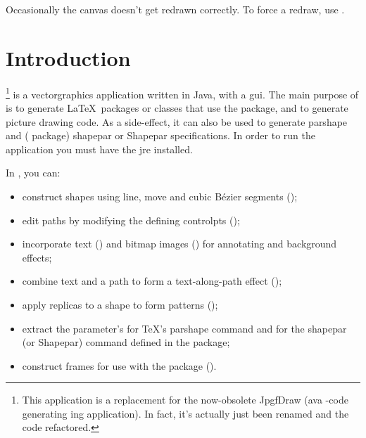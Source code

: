 Occasionally the canvas doesn't get redrawn correctly. To force a
redraw, use .


\mainmatter
\chapter{Introduction}
\label{sec:introduction}

\appname\footnote{This application is a replacement for the now-obsolete
   JpgfDraw (ava -code generating ing application).
   In fact, it's actually just been renamed and the code refactored.}
   is a \gls{vectorgraphics} application written in \gls{Java}, with a 
   \gls{gui}.  The main purpose of \appname is to generate \LaTeX\ packages or 
   classes that use the  package, and to generate
    picture drawing code. As a side-effect, it can also be
   used to generate \gls{parshape} and ( package) \gls{shapepar} or 
   \gls{Shapepar} specifications. In order to run the application you 
   must have the \gls{jre} installed.


   In \appname, you can:

   \begin{itemize}
    \item construct shapes using line, move and cubic Bézier segments
();

    \item edit paths by modifying the defining \glspl{controlpt}
    ();

    \item incorporate text () and 
    bitmap images ()
    for annotating and background effects;

    \item combine text and a path to form a text-along-path
    effect ();

    \item apply replicas to a shape to form patterns
    ();

    \item extract the parameter's for \TeX's \gls{parshape} command and for 
    the \gls{shapepar} (or \gls{Shapepar}) command defined in the
     package;

    \item construct frames for use with the  package
    ().
   \end{itemize}

